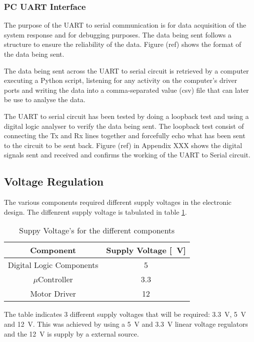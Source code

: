 \subsubsection{PC UART Interface }

The purpose of the UART to serial communication is for data acquisition of the system response and for debugging purposes. The data being sent follows a structure to ensure the reliability of the data. Figure (ref) shows the format of the data being sent.

The data being sent across the UART to serial circuit is retrieved by a computer executing a Python script, listening for any activity on the computer's driver ports and writing the data into a comma-separated value (csv) file that can later be use to analyse the data.


The UART to serial circuit has been tested by doing a loopback test and using a digital logic analyser to verify the data being sent. The loopback test consist of connecting the Tx and Rx lines together and forcefully echo what has been sent to the circuit to be sent back. Figure (ref) in Appendix XXX shows the digital signals sent and received and confirms the working of the UART to Serial circuit. 

\subsection{Voltage Regulation}

The various components required different supply voltages in the electronic design. The diffenrent supply voltage is tabulated in table \ref{table:supplyVoltage}.

\begin{table}[]
	\centering
	\begin{tabular}{|c|c|}
		\hline
		Component & Supply Voltage [\SI{}{V}] \\
		\hline
		\hline
		Digital Logic Components & \SI{5}{} \\
		\hline
		$\mu$Controller & \SI{3.3}{} \\
		\hline
		Motor Driver & \SI{12}{} \\
		\hline
	\end{tabular}
	\caption{Suppy Voltage's for the different components}
	\label{table:supplyVoltage}
\end{table}


The table indicates 3 different supply voltages that will be required: \SI{3.3}{V}, \SI{5}{V} and \SI{12}{V}. This was achieved by using a \SI{5}{V} and \SI{3.3}{V} linear voltage regulators and the \SI{12}{V} is supply by a external source.

